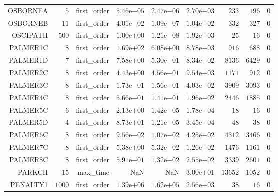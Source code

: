 \begin{longtable}{rrrrrrrrr}
OSBORNEA & \(     5\) & first\_order & \( 5.46\)e\(-05\) & \( 2.47\)e\(-06\) & \( 2.70\)e\(-03\) & \(   233\) & \(   196\) & \(     0\) \\
OSBORNEB & \(    11\) & first\_order & \( 4.01\)e\(-02\) & \( 1.09\)e\(-07\) & \( 1.04\)e\(-02\) & \(   332\) & \(   327\) & \(     0\) \\
OSCIPATH & \(   500\) & first\_order & \( 1.00\)e\(+00\) & \( 1.21\)e\(-08\) & \( 1.92\)e\(-03\) & \(    25\) & \(    16\) & \(     0\) \\
PALMER1C & \(     8\) & first\_order & \( 1.69\)e\(+02\) & \( 6.08\)e\(+00\) & \( 8.78\)e\(-03\) & \(   916\) & \(   688\) & \(     0\) \\
PALMER1D & \(     7\) & first\_order & \( 7.58\)e\(+00\) & \( 5.30\)e\(-01\) & \( 8.34\)e\(-02\) & \(  8136\) & \(  6429\) & \(     0\) \\
PALMER2C & \(     8\) & first\_order & \( 4.43\)e\(+00\) & \( 4.56\)e\(-01\) & \( 9.54\)e\(-03\) & \(  1171\) & \(   912\) & \(     0\) \\
PALMER3C & \(     8\) & first\_order & \( 1.73\)e\(-01\) & \( 1.56\)e\(-01\) & \( 4.03\)e\(-02\) & \(  3909\) & \(  3093\) & \(     0\) \\
PALMER4C & \(     8\) & first\_order & \( 5.66\)e\(-01\) & \( 1.41\)e\(-01\) & \( 1.96\)e\(-02\) & \(  2446\) & \(  1885\) & \(     0\) \\
PALMER5C & \(     6\) & first\_order & \( 2.13\)e\(+00\) & \( 1.42\)e\(-05\) & \( 1.78\)e\(-04\) & \(    18\) & \(    16\) & \(     0\) \\
PALMER5D & \(     4\) & first\_order & \( 8.73\)e\(+01\) & \( 1.21\)e\(-05\) & \( 3.45\)e\(-04\) & \(    48\) & \(    38\) & \(     0\) \\
PALMER6C & \(     8\) & first\_order & \( 9.56\)e\(-02\) & \( 1.07\)e\(-02\) & \( 4.25\)e\(-02\) & \(  4312\) & \(  3466\) & \(     0\) \\
PALMER7C & \(     8\) & first\_order & \( 5.38\)e\(+00\) & \( 5.32\)e\(-02\) & \( 1.26\)e\(-02\) & \(  1476\) & \(  1161\) & \(     0\) \\
PALMER8C & \(     8\) & first\_order & \( 5.91\)e\(-01\) & \( 1.32\)e\(-02\) & \( 2.55\)e\(-02\) & \(  3339\) & \(  2601\) & \(     0\) \\
PARKCH & \(    15\) & max\_time &       NaN &       NaN & \( 3.00\)e\(+01\) & \( 13652\) & \(  1052\) & \(     0\) \\
PENALTY1 & \(  1000\) & first\_order & \( 1.39\)e\(+06\) & \( 1.62\)e\(+05\) & \( 2.56\)e\(-03\) & \(    38\) & \(    16\) & \(     0\) \\

\end{longtable}
